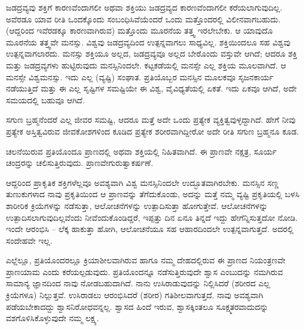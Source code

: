 \vskip 6pt

ಜಡದ್ರವ್ಯವು ಶಕ್ತಿಗೆ ಕಾರಣವೆಂದಾಗಲೀ ಅಥವಾ ಶಕ್ತಿಯು ಜಡದ್ರವ್ಯದ ಕಾರಣವೆಂದಾಗಲೀ ಕರೆಯಲಾಗುವುದಿಲ್ಲ. ಅವೆರಡೂ ಯಾವ ರೀತಿ ಒಂದಕ್ಕೊಂದು ಸಂಬಂಧಿಸಿವೆಯೆಂದರೆ ಒಂದು ಮತ್ತೊಂದರಲ್ಲಿ ವಿಲೀನವಾಗಬಹುದು. (ಆದ್ದರಿಂದ ಇವೆರಡಕ್ಕೂ ಕಾರಣವಾಗಿರುವ) ಮತ್ತೊಂದು ಮೂರನೆಯ ತತ್ತ್ವ ಇರಲೇಬೇಕು. ಆ ಯಾವುದೊ ಮೂರನೆಯ ತತ್ತ್ವವೇ ಮನಸ್ಸು. ವಿಶ್ವವು ಜಡದ್ರವ್ಯದಿಂದ ಉತ್ಪನ್ನವಾಗಲು ಸಾಧ್ಯವಿಲ್ಲ. ಶಕ್ತಿಯಿಂದಲೂ ಸಹ ವಿಶ್ವವು ಉತ್ಪನ್ನವಾಗಲಾರದು. ಮನಸ್ಸು ಶಕ್ತಿಯೂ ಅಲ್ಲದ, ಜಡದ್ರವ್ಯವೂ ಅಲ್ಲದ ಬೇರೊಂದು ವಸ್ತುವೇ ಆಗಿದೆ; ಆದರೂ ಶಕ್ತಿ ಮತ್ತು ಜಡದ್ರವ್ಯಗಳು ಹುಟ್ಟಿರುವುದು ಮನಸ್ಸಿನಿಂದಲೇ. ಕಟ್ಟಕಡೆಯಲ್ಲಿ ಮನಸ್ಸೇ ಎಲ್ಲ ಶಕ್ತಿಯ ಮೂಲವಾಗಿದೆ. ಆ ಮನಸ್ಸೇ ವಿಶ್ವಮನಸ್ಸು. ಇದು ಎಲ್ಲ (ವ್ಯಷ್ಟಿ) ಸಂಘಾತ. ಪ್ರತಿಯೊಬ್ಬರ ಮನಸ್ಸಿನ ಮೂಲಕವೂ ಸೃಜನಕಾರ್ಯ ನಡೆಯುತ್ತಿದೆ ಮತ್ತು ಈ ಎಲ್ಲ ಸೃಷ್ಟಿಗಳ ಸಮಷ್ಟಿಯೇ ಈ ವಿಶ್ವ, ವೈವಿಧ್ಯತೆಯಲ್ಲಿ ಏಕತೆ. ಇದು ಏಕವೂ ಆಗಿದೆ, ಅದೇ ಸಮಯದಲ್ಲಿ ಬಹುವೂ ಆಗಿದೆ.

\vskip 6pt

ಸಗುಣ ಬ್ರಹ್ಮನೆಂದರೆ ಎಲ್ಲ ಜೀವರ ಸಮಷ್ಟಿ, ಆದರೂ ಮತ್ತೆ ಅದೇ ಒಂದು ಪ್ರತ್ಯೇಕ ವ್ಯಕ್ತಿತ್ವವುಳ್ಳದ್ದಾಗಿದೆ. ಹೇಗೆ ನೀವು ಪ್ರತ್ಯೇಕ ಅಸ್ತಿತ್ವವಿರುವ ಜೀವಕೋಶಗಳಿಂದ ಕೂಡಿದ ಪ್ರತ್ಯೇಕ ಶರೀರವಾಗಿದ್ದೀರೋ ಅದೇ ರೀತಿ ಸಗುಣ ಬ್ರಹ್ಮನೂ ಕೂಡ.

\vskip 6pt

ಚಲನೆಯಿರುವ ಪ್ರತಿಯೊಂದೂ ಪ್ರಾಣದಲ್ಲಿ ಅಥವಾ ಶಕ್ತಿಯಲ್ಲಿ ನಿಹಿತವಾಗಿದೆ. ಈ ಪ್ರಾಣವೇ ನಕ್ಷತ್ರ, ಸೂರ್ಯ ಚಂದ್ರರನ್ನು ಚಲಿಸುತ್ತಿರುವುದು. ಪ್ರಾಣವೇ\break ಗುರುತ್ವಾಕರ್ಷಣೆ.

\vskip 6pt

ಆದ್ದರಿಂದ ಪ್ರಾಕೃತಿಕ ಶಕ್ತಿಗಳೆಲ್ಲವೂ ಅವಶ್ಯವಾಗಿ ವಿಶ್ವ ಮನಸ್ಸಿನಿಂದಲೇ ಉದ್ಭೂತವಾಗಿರಬೇಕು. ಮನಸ್ಸಿನ ಸಣ್ಣ ತುಣುಕುಗಳಾದ ನಾವು ಪ್ರಕೃತಿಯಿಂದ ಆ ಪ್ರಾಣವನ್ನು ತೆಗೆದುಕೊಂಡು, ಅದನ್ನು ಮತ್ತೆ ನಮ್ಮ ವ್ಯಷ್ಟಿ ಪ್ರಕೃತಿಯಲ್ಲಿ ಬಳಸಿ ಶಾರೀರಿಕ ಕ್ರಿಯೆಗಳನ್ನು ನಡೆಸುತ್ತಾ, ಆಲೋಚನೆಗಳನ್ನು ಉತ್ಪಾದಿಸುತ್ತಾ ಹೋಗುತ್ತೇವೆ. ಆಲೋಚನೆಗಳನ್ನು ಉತ್ಪಾದಿಸಲಾಗುವುದಿಲ್ಲವೆಂದು ನೀವೆಂದುಕೊಂಡಿದ್ದರೆ, ಇಪ್ಪತ್ತು ದಿನ ಏನೂ ತಿನ್ನದೆ ಇದ್ದು ಹೇಗೆನ್ನಿಸುತ್ತದೋ ನೋಡಿ. ಇಂದೇ ಆರಂಭಿಸಿ – ಲೆಕ್ಕ ಹಾಕುತ್ತಾ ಹೋಗಿ, ಆಲೋಚನೆಯೂ ಸಹ ಆಹಾರದಿಂದಲೇ ಉತ್ಪನ್ನವಾಗುತ್ತದೆ. ಅದರಲ್ಲಿ ಸಂದೇಹವೇ ಇಲ್ಲ.

\vskip 6pt

ಎಲ್ಲೆಲ್ಲೂ, ಪ್ರತಿಯೊಂದರಲ್ಲೂ ಕ್ರಿಯಾಶೀಲವಾಗಿರುವ ಹಾಗೂ ನಮ್ಮ ದೇಹದಲ್ಲಿರುವ ಈ ಪ್ರಾಣದ ನಿಯಂತ್ರಣವೇ ಪ್ರಾಣಯಾಮ ಎಂದು ಕರೆಯಲ್ಪಡುವುದು. ಪ್ರತಿಯೊಂದನ್ನೂ ನಡೆಸುತ್ತಿರುವುದೇ ಶ್ವಾಸ ಎಂಬುದನ್ನು ನಮಗಿರುವ ಸಾಮಾನ್ಯ ಜ್ಞಾನದಿಂದ ನಾವು ನೋಡಬಹುದಾಗಿದೆ. ನಾನು ಉಸಿರಾಡುವುದನ್ನು ನಿಲ್ಲಿಸಿದರೆ (ಶರೀರದ ಎಲ್ಲ ಕ್ರಿಯೆಗಳೂ) ನಿಲ್ಲುತ್ತವೆ. ಉಸಿರಾಡಲು ಆರಂಭಿಸಿದರೆ (ಶರೀರ) ಗತಿಶೀಲವಾಗುತ್ತದೆ. ನಾವು ಅವಶ್ಯವಾಗಿ ಪಡೆಯಬೇಕಾದದ್ದು ಶ್ವಾಸನಿರೋಧವನ್ನಲ್ಲ. ಶ್ವಾಸದ ಹಿಂದೆ ಇರುವ, ಶ್ವಾಸಕ್ಕಿಂತಲೂ ಸೂಕ್ಷ್ಮತರವಾದುದನ್ನು ವಶಗೊಳಿಸಿಕೊಳ್ಳುವುದೇ ನಮ್ಮ ಲಕ್ಷ್ಯ.

\vskip 6pt

